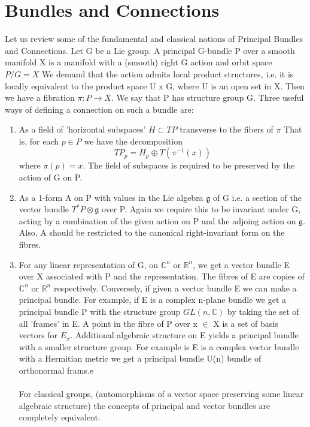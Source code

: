 \documentclass[a4paper,10pt]{article}
\begin{document}
\section{Bundles and Connections}
Let us review some of the fundamental and classical notions of Principal Bundles and Connections.
Let G be a Lie group. A principal G-bundle P over a smooth manifold X is a manifold with a (smooth) right G
action and orbit space $P/G = X$
   We demand that the action admits local product structures, i.e. it is locally
   equivalent to the product space U x G, where U is an open set in X. Then we have a fibration 
   $\pi: P \rightarrow X$. We say that P has structure group G.
 Three useful ways of defining a connection on such a bundle are:
 \begin{enumerate}
  \item As a field of 'horizontal subspaces' $H \subset TP$ transverse to the fibers of $\pi$
  That is, for each $p \in P$ we have the decomposition
  \begin{equation*}
   TP_{p} = H_p \oplus T(\pi^{-1}(x))
  \end{equation*}
where $\pi(p) = x$. The field of subspaces is required to be preserved by the action of G on P. 
\item As a 1-form A on P with values in the Lie algebra $\mathfrak{g}$ of G i.e. a section of the 
vector bundle 
$T^*P \otimes \mathfrak{g}$
over P. Again we require this to be invariant under G, acting by a combination of the given action on P and
the adjoing action on $\mathfrak{g}$. Also, A should be restricted to the canonical right-invariant form on the 
fibres.
\item For any linear representation of G, on $\mathbb{C}^n$ or $\mathbb{R}^n$, we get a vector bundle E over X 
associated with P and the representation. The fibres of E are copies of $\mathbb{C}^n$ or $\mathbb{R}^n$ respectively. 
Conversely, if given a vector bundle E we can make a principal bundle. For example, if E is a complex
n-plane bundle we get a principal bundle P with the structure group $GL(n,\mathbb{C})$ by taking the set of 
all 'frames' in E. A point in the fibre of P over x $\in$ X is a set of basis vectors for $E_x$. Additional algebraic
structure on E yields a principal bundle with a smaller structure group. For example is E is a complex vector bundle with
a Hermitian metric we get a principal bundle U(n) bundle of orthonormal frams.e 
   \paragraph{} For classical groups, (automorphisms of a vector space preserving some linear algebraic structure)
   the concepts of principal and vector bundles are completely equivalent. 

 \end{enumerate}
\end{document}
